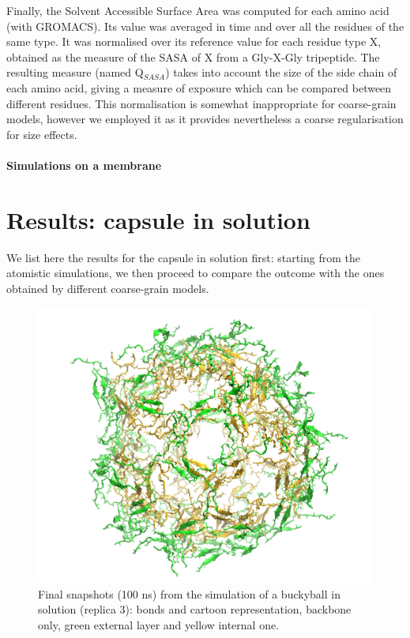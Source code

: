 Finally, the Solvent Accessible Surface Area was computed for each amino acid (with GROMACS). Its value was averaged in time and over all the residues of the same type. It was normalised over its reference value for each residue type X, obtained as the measure of the SASA of X from a Gly-X-Gly tripeptide. The resulting measure (named Q$_{SASA}$) takes into account the size of the side chain of each amino acid, giving a measure of exposure which can be compared between different residues. 
%
This normalisation is somewhat inappropriate for coarse-grain models, however we employed it as it provides nevertheless a coarse regularisation for size effects.

\paragraph{Simulations on a membrane}


\section{Results: capsule in solution} \label{sec:results_cap}
We list here the results for the capsule in solution first: starting from the atomistic simulations, we then proceed to compare the outcome with the ones obtained by different coarse-grain models.

\begin{figure}[t]
\centering
\includegraphics[width=0.5\linewidth]{3results_capsule/pics/staR3_render}
\caption[Atomistic run of buckyball in solution: final configuration]{Final snapshots (100 ns) from the simulation of a buckyball in solution (replica 3): bonds and cartoon representation, backbone only, green external layer and yellow internal one.}
\label{fig:BTI_snap}
\end{figure}

